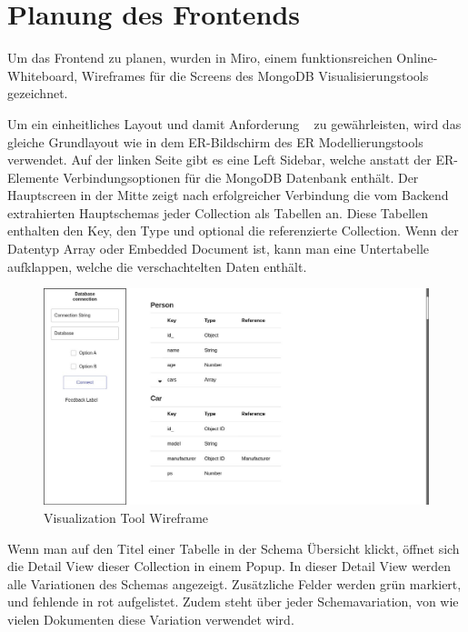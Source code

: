 \section{Planung des Frontends}
\label{sec:planung_frontend}

Um das Frontend zu planen, wurden in Miro, einem funktionsreichen Online-Whiteboard, Wireframes für die Screens des MongoDB Visualisierungstools gezeichnet.

Um ein einheitliches Layout und damit Anforderung ~ zu gewährleisten, wird das gleiche Grundlayout wie in dem ER-Bildschirm des ER Modellierungstools verwendet.
Auf der linken Seite gibt es eine Left Sidebar, welche anstatt der ER-Elemente Verbindungsoptionen für die MongoDB Datenbank enthält. 
Der Hauptscreen in der Mitte zeigt nach erfolgreicher Verbindung die vom Backend extrahierten Hauptschemas jeder Collection als Tabellen an.
Diese Tabellen enthalten den Key, den Type und optional die referenzierte Collection.
Wenn der Datentyp Array oder Embedded Document ist, kann man eine Untertabelle aufklappen, welche die verschachtelten Daten enthält.


\begin{figure}[H]
    \includegraphics[width=\textwidth]{images/wireframe_vis_tool}
    \caption{Visualization Tool Wireframe}
    \label{fig:wireframe_vis_tool}
\end{figure}

Wenn man auf den Titel einer Tabelle in der Schema Übersicht klickt, öffnet sich die Detail View dieser Collection in einem Popup.
In dieser Detail View werden alle Variationen des Schemas angezeigt.
Zusätzliche Felder werden grün markiert, und fehlende in rot aufgelistet.
Zudem steht über jeder Schemavariation, von wie vielen Dokumenten diese Variation verwendet wird.

